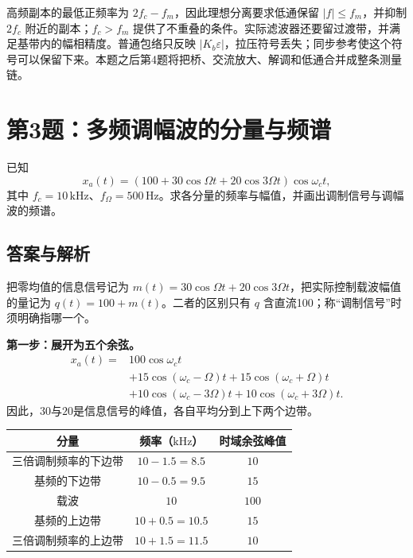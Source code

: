高频副本的最低正频率为 $2f_c-f_m$，因此理想分离要求低通保留 $|f|\leq f_m$，并抑制 $2f_c$ 附近的副本；$f_c>f_m$ 提供了不重叠的条件。实际滤波器还要留过渡带，并满足基带内的幅相精度。普通包络只反映 $|K_b\varepsilon|$，拉压符号丢失；同步参考使这个符号可以保留下来。本题之后第4题将把桥、交流放大、解调和低通合并成整条测量链。

\section{第3题：多频调幅波的分量与频谱}
\label{hw:5-3}

\begin{hwquestion}
已知
\[
x_a(t)=(100+30\cos\Omega t+20\cos3\Omega t)\cos\omega_ct,
\]
其中 $f_c=10\,\mathrm{kHz}$、$f_\Omega=500\,\mathrm{Hz}$。求各分量的频率与幅值，并画出调制信号与调幅波的频谱。
\end{hwquestion}

\subsection*{答案与解析}
把零均值的信息信号记为 $m(t)=30\cos\Omega t+20\cos3\Omega t$，把实际控制载波幅值的量记为 $q(t)=100+m(t)$。二者的区别只有 $q$ 含直流100；称“调制信号”时须明确指哪一个。

\textbf{第一步：展开为五个余弦。}
\begin{align*}
x_a(t)={}&100\cos\omega_ct\\
&+15\cos(\omega_c-\Omega)t+15\cos(\omega_c+\Omega)t\\
&+10\cos(\omega_c-3\Omega)t+10\cos(\omega_c+3\Omega)t.
\end{align*}
因此，$30$与$20$是信息信号的峰值，各自平均分到上下两个边带。

\begin{table}[H]
\centering
\begin{tabular}{@{}c c c@{}}
\toprule
分量 & 频率（$\mathrm{kHz}$） & 时域余弦峰值 \\
\midrule
三倍调制频率的下边带 & $10-1.5=8.5$ & $10$ \\
基频的下边带 & $10-0.5=9.5$ & $15$ \\
载波 & $10$ & $100$ \\
基频的上边带 & $10+0.5=10.5$ & $15$ \\
三倍调制频率的上边带 & $10+1.5=11.5$ & $10$ \\
\bottomrule
\end{tabular}
\end{table}

